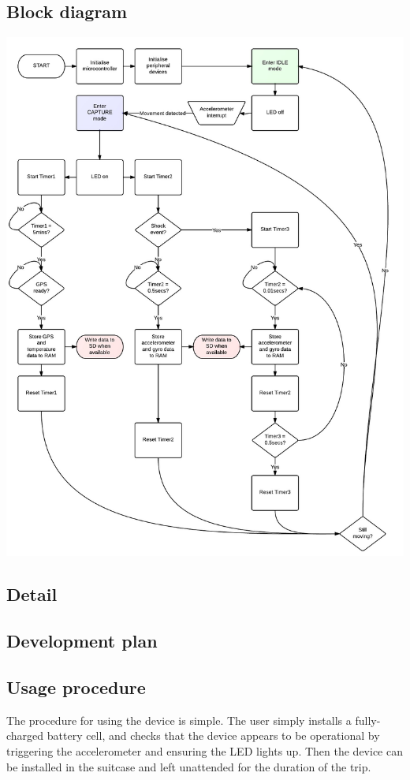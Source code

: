 \documentclass[a4paper, twoside]{article}
\begin{document}
\subsection{Block diagram}
\begin{center}
	\includegraphics[scale=0.35]{images/software.jpeg}
\end{center}

\subsection{Detail} %

\subsection{Development plan}

\subsection{Usage procedure}
The procedure for using the device is simple. The user simply installs a
fully-charged battery cell, and checks that the device appears to be operational
by triggering the accelerometer and ensuring the LED lights up. Then the device
can be installed in the suitcase and left unattended for the duration of the
trip.
\end{document}
